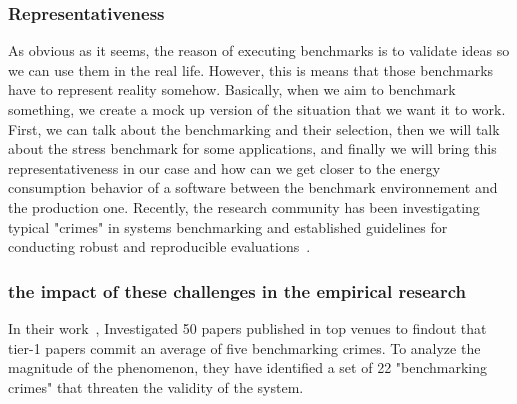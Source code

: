 \subsubsection{Representativeness}
As obvious as it seems, the reason of executing benchmarks is to validate ideas so we can use them in the real life.
However, this is means that those benchmarks have to represent reality somehow.
Basically, when we aim to benchmark something, we create a mock up version of the situation that we want it to work.
First, we can talk about the benchmarking and their selection, then we will talk about the stress benchmark for some applications, and finally we will bring this representativeness in our case and how can we get closer to the energy consumption behavior of a software between the benchmark environnement and the production one.
Recently, the research community has been investigating typical "crimes" in systems benchmarking and established guidelines for conducting robust and reproducible evaluations~\cite{DBLP:journals/corr/abs-1801-02381}.

\subsubsection{the impact of these challenges in the empirical research }
In their work~\cite{van_der_kouwe_benchmarking_2018}, \citeauthor{van_der_kouwe_benchmarking_2018} Investigated 50 papers published in top venues
to findout that tier-1 papers commit an average of five benchmarking crimes.
To analyze the magnitude of the phenomenon, they have identified a set of 22 "benchmarking crimes" that threaten the validity of the system.



